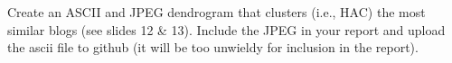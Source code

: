 Create an ASCII and JPEG dendrogram that clusters (i.e., HAC)
the most similar blogs (see slides 12 \& 13).  Include the JPEG in your report and upload the ascii file to github (it will be too unwieldy for inclusion in the report).